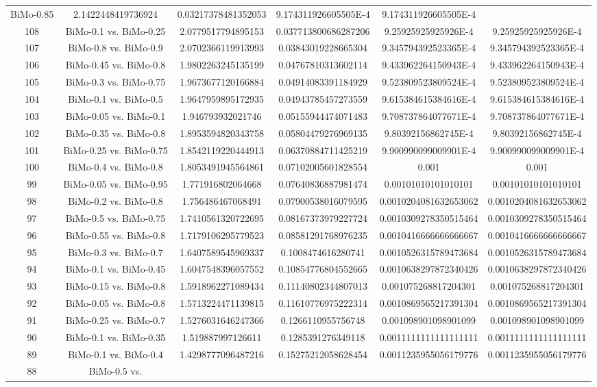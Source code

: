 \documentclass[a4paper,10pt]{article}
\begin{document}
\begin{landscape}
\begin{table}[!htp]
\begin{tabular}{cccccc}
BiMo-0.85&2.1422448419736924&0.03217378481352053&9.174311926605505E-4&9.174311926605505E-4\\108&BiMo-0.1 vs. BiMo-0.25&2.0779517794895153&0.037713800686287206&9.25925925925926E-4&9.25925925925926E-4\\107&BiMo-0.8 vs. BiMo-0.9&2.0702366119913993&0.03843019228665304&9.345794392523365E-4&9.345794392523365E-4\\106&BiMo-0.45 vs. BiMo-0.8&1.9802263245135199&0.04767810313602114&9.433962264150943E-4&9.433962264150943E-4\\105&BiMo-0.3 vs. BiMo-0.75&1.9673677120166884&0.04914083391184929&9.523809523809524E-4&9.523809523809524E-4\\104&BiMo-0.1 vs. BiMo-0.5&1.9647959895172935&0.04943785457273559&9.615384615384616E-4&9.615384615384616E-4\\103&BiMo-0.05 vs. BiMo-0.1&1.946793932021746&0.05155944474071483&9.708737864077671E-4&9.708737864077671E-4\\102&BiMo-0.35 vs. BiMo-0.8&1.8953594820343758&0.05804479276969135&9.80392156862745E-4&9.80392156862745E-4\\101&BiMo-0.25 vs. BiMo-0.75&1.8542119220444913&0.06370884711425219&9.900990099009901E-4&9.900990099009901E-4\\100&BiMo-0.4 vs. BiMo-0.8&1.8053491945564861&0.07102005601828554&0.001&0.001\\99&BiMo-0.05 vs. BiMo-0.95&1.771916802064668&0.07640836887981474&0.00101010101010101&0.00101010101010101\\98&BiMo-0.2 vs. BiMo-0.8&1.756486467068491&0.07900538016079595&0.0010204081632653062&0.0010204081632653062\\97&BiMo-0.5 vs. BiMo-0.75&1.7410561320722695&0.08167373979227724&0.0010309278350515464&0.0010309278350515464\\96&BiMo-0.55 vs. BiMo-0.8&1.7179106295779523&0.08581291768976235&0.0010416666666666667&0.0010416666666666667\\95&BiMo-0.3 vs. BiMo-0.7&1.6407589545969337&0.1008474616280741&0.0010526315789473684&0.0010526315789473684\\94&BiMo-0.1 vs. BiMo-0.45&1.6047548396057552&0.10854776804552665&0.0010638297872340426&0.0010638297872340426\\93&BiMo-0.15 vs. BiMo-0.8&1.5918962271089434&0.11140802344807013&0.001075268817204301&0.001075268817204301\\92&BiMo-0.05 vs. BiMo-0.8&1.5713224471139815&0.11610776975222314&0.0010869565217391304&0.0010869565217391304\\91&BiMo-0.25 vs. BiMo-0.7&1.5276031646247366&0.1266110955756748&0.001098901098901099&0.001098901098901099\\90&BiMo-0.1 vs. BiMo-0.35&1.519887997126611&0.1285391276349118&0.0011111111111111111&0.0011111111111111111\\89&BiMo-0.1 vs. BiMo-0.4&1.4298777096487216&0.15275212058628454&0.0011235955056179776&0.0011235955056179776\\88&BiMo-0.5 vs. 
\end{tabular}
\end{table}
\end{landscape}
\end{document}
